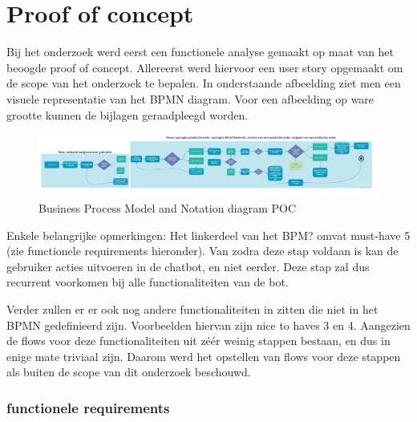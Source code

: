 \section{Proof of concept}
Bij het onderzoek werd eerst een functionele analyse gemaakt op maat van het beoogde proof of concept. Allereerst werd hiervoor een user story opgemaakt om de scope van het onderzoek te bepalen. In onderstaande afbeelding ziet men een visuele representatie van het BPMN diagram. Voor een afbeelding op ware grootte kunnen de bijlagen geraadpleegd worden. 

\begin{figure}[h]
    \centering
    \includegraphics[width=1\textwidth]{img/HappyFlows.jpg}
    \caption{Business Process Model and Notation diagram POC }
\end{figure}

Enkele belangrijke opmerkingen: 
Het linkerdeel van het BPM? omvat must-have 5 (zie functionele requirements hieronder). Van zodra deze stap voldaan is kan de gebruiker acties uitvoeren in de chatbot, en niet eerder. Deze stap zal dus recurrent voorkomen bij alle functionaliteiten van de bot.

Verder zullen er er ook nog andere functionaliteiten in zitten die niet in het BPMN gedefinieerd zijn. Voorbeelden hiervan zijn nice to haves 3 en 4. Aangezien de flows voor deze functionaliteiten uit zéér weinig stappen bestaan, en dus in enige mate triviaal zijn. Daarom werd het opstellen van flows voor deze stappen als buiten de scope van dit onderzoek beschouwd. 

\subsubsection{functionele requirements}

